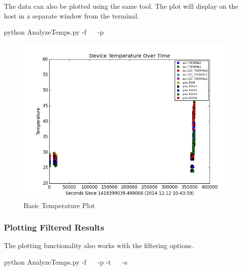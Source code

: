 The data can also be plotted using the same tool. The plot will display on the
host in a separate window from the terminal. 

\begin{CommandLine}
python AnalyzeTemps.py -f ~~ -p
\end{CommandLine}

\begin{figure}[!htb]
\begin{center}
	\includegraphics[scale=0.75]{BasicPlot}

	\caption{Basic Temperature Plot}
	\label{fig:BasicTemperaturePlot}

\end{center}
\end{figure}

\newpage 
\subsubsection{Plotting Filtered Results}
The plotting functionality also works with the filtering options.

\begin{CommandLine}
python AnalyzeTemps.py -f ~~ -p -t ~~ -s ~~
\end{CommandLine}

